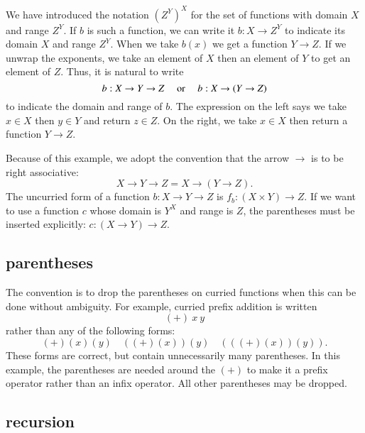 \documentclass[cup9a]{cupbook}
\begin{document}
We have introduced the notation $(Z^Y)^X$ for the set of functions with domain $X$ and range $Z^Y$.    If $b$ is such a function, we can write it
$b:X\to Z^Y$ to indicate its domain $X$ and range $Z^Y$.  When we take
$b(x)$ we get a function $Y\to Z$.  If we unwrap the exponents, we
take an element of $X$ then an element of $Y$ to get an element of $Z$.
Thus, it is natural to write
$$
b:X\to Y\to Z\quad \hbox{ or }\quad  b:X\to (Y\to Z)
$$
to indicate the domain and range of $b$.  The expression on the left
says we take $x\in X$ then $y\in Y$ and return $z\in Z$.  On the
right, we take $x\in X$ then return a function $Y\to Z$.

Because of this example, we adopt the convention that the arrow $\to$
is to be right associative:
$$
X\to Y \to Z = X\to (Y\to Z).
$$
The uncurried form of a function $b:X\to Y\to Z$ is $f_b:(X\times Y)\to Z$.
If we want to use a function $c$ whose domain is $Y^X$ and range is $Z$,
the parentheses must be inserted explicitly: $c:(X\to Y)\to Z$.

\subsection{parentheses}

The convention is to drop the parentheses on curried functions when this can be done without ambiguity.  For example, curried prefix addition is written
$$
(+)~x~y
$$
rather than any of the following forms:
$$
(+)(x)(y)\quad ((+)(x))(y)  \quad (((+)(x))(y)).
$$
These forms are correct, but contain unnecessarily many parentheses.
In this example, the parentheses are needed around the $(+)$ to make it
a prefix operator rather than an infix operator. All other parentheses may
be dropped.

\subsection{recursion}
\end{document}
